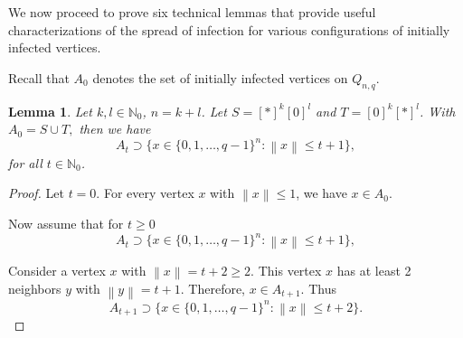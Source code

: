 \documentclass[reqno,11pt]{amsart}
\newtheorem{lemma}[theorem]{Lemma}
\renewcommand{\leq}{\leqslant}
\renewcommand{\geq}{\geqslant}
\begin{document}
We now proceed to prove six technical lemmas that provide useful characterizations of the spread of infection for various configurations of initially infected vertices.

Recall that $A_0$ denotes the set of initially infected vertices on $Q_{n,q}$.

\begin{lemma} \label{lemma:ST1}
Let $k,l \in \mathbb{N}_0$, $n=k+l$. Let $S=[*]^k[0]^l$ and $T=[0]^k[*]^l$. With $A_0=S \cup T,$ then we have
$$A_t \supset \{x \in \{0,1,\dots,q-1\}^n: \left \lVert x \right \rVert \leq t+1\},$$
for all $t \in \mathbb{N}_0$.
\end{lemma}
\begin{proof}
Let $t=0$. For every vertex $x$ with $\left \lVert x \right \rVert \leq 1$, we have $x \in A_0$. 

Now assume that for $t \geq 0$
$$A_t \supset \{x \in \{0,1,\dots,q-1\}^n: \left \lVert x \right \rVert \leq t+1\},$$

Consider a vertex $x$ with $\left \lVert x \right \rVert =t+2 \geq 2$. This vertex $x$ has at least 2 neighbors $y$ with $\left \lVert y \right \rVert =t+1$. Therefore, $x \in A_{t+1}$. Thus
$$A_{t+1} \supset \{x \in \{0,1,\dots,q-1\}^n: \left \lVert x \right \rVert \leq t+2\}.$$
\end{proof}
\end{document}
